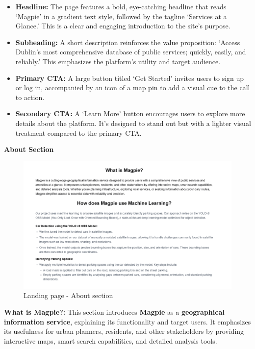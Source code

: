 \begin{itemize}
    \item{} \textbf{Headline:} The page features a bold, eye{-}catching headline
    that reads `Magpie' in a gradient text style, followed by the tagline
    `Services at a Glance.' This is a clear and engaging introduction to the
    site's purpose.
    \item{} \textbf{Subheading:} A short description reinforces the value
    proposition: `Access Dublin's most comprehensive database of public
    services; quickly, easily, and reliably.' This emphasizes the platform's
    utility and target audience.
    \item{} \textbf{Primary CTA:} A large button titled `Get Started' invites
    users to sign up or log in, accompanied by an icon of a map pin to add a
    visual cue to the call to action.
    \item{} \textbf{Secondary CTA:} A `Learn More' button encourages users to
    explore more details about the platform. It's designed to stand out but with
    a lighter visual treatment compared to the primary CTA\@.
\end{itemize}

\newpage{}

\textbf{About Section}

\begin{figure}[htbp]
    \centering{}
    \includegraphics[width=1\textwidth]{images/site/landing/landing_2_about.png}
    \caption{Landing page {-} About section}
\end{figure}

\textbf{What is Magpie?:} This section introduces \textbf{Magpie} as a
\textbf{geographical information service}, explaining its functionality and
target users. It emphasizes its usefulness for urban planners, residents, and
other stakeholders by providing interactive maps, smart search capabilities, and
detailed analysis tools.

